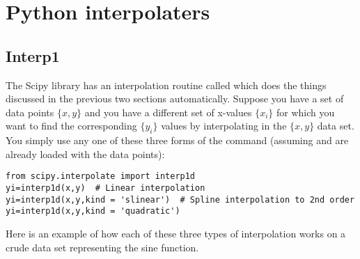 \section{Python interpolaters}

\subsection*{Interp1}
 The Scipy library has an interpolation routine called  which does the things discussed in the previous two sections
automatically. Suppose you have a set of data points $\{x,y\}$ and
you have a different set of x-values $\{x_i\}$ for which you want to
find the corresponding $\{y_i\}$ values by interpolating in the
$\{x,y\}$ data set. You simply use any one of these three forms of
the  command (assuming  and  are already
loaded with the data points):
\begin{Verbatim}
from scipy.interpolate import interp1d
yi=interp1d(x,y)  # Linear interpolation
yi=interp1d(x,y,kind = 'slinear')  # Spline interpolation to 2nd order
yi=interp1d(x,y,kind = 'quadratic')
\end{Verbatim}

Here is an example of how each of these three types of interpolation
works on a crude data set representing the sine function.

